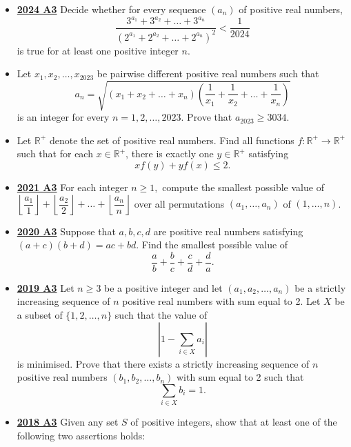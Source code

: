 \documentclass[11pt]{scrartcl}
\begin{document}
\begin{itemize}[leftmargin=*]
Determine all values of $\lambda$ for which Alice has a winning strategy and all those for which Bazza has a winning strategy.
\item \href{https://artofproblemsolving.com/community/c6h3610463p35340954}{\textbf{2024 A3}} Decide whether for every sequence $(a_n)$ of positive real numbers,
$$\frac{3^{a_1}+3^{a_2}+\dots+3^{a_n}}{(2^{a_1}+2^{a_2}+\dots+2^{a_n})^2} < \frac{1}{2024}$$
is true for at least one positive integer $n$.
\item {} Let $x_1,x_2,\dots,x_{2023}$ be pairwise different positive real numbers such that
\[a_n=\sqrt{(x_1+x_2+\dots+x_n)\left(\frac{1}{x_1}+\frac{1}{x_2}+\dots+\frac{1}{x_n}\right)}\]is an integer for every $n=1,2,\dots,2023.$ Prove that $a_{2023} \geqslant  3034$.
\item {} Let $\mathbb{R}^+$ denote the set of positive real numbers. Find all functions $f: \mathbb{R}^+ \to \mathbb{R}^+$ such that for each $x \in \mathbb{R}^+$, there is exactly one $y \in \mathbb{R}^+$ satisfying$$xf(y)+yf(x) \leqslant 2.$$ 
\item \href{https://artofproblemsolving.com/community/c6h2882539p25627503}{\textbf{2021 A3}} For each integer $n\geqslant 1,$ compute the smallest possible value of  $\left\lfloor\dfrac{a_1}{1}\right\rfloor+\left\lfloor\dfrac{a_2}{2}\right\rfloor+\dots+\left\lfloor\dfrac{a_n}{n}\right\rfloor$ over all permutations $(a_1,\dots,a_n)$ of $(1,\dots,n)$.
\item \href{https://artofproblemsolving.com/community/c6h2625839p22697887}{\textbf{2020 A3}} Suppose that $a,b,c,d$ are positive real numbers satisfying $(a+c)(b+d)=ac+bd$. Find the smallest possible value of
$$\frac{a}{b}+\frac{b}{c}+\frac{c}{d}+\frac{d}{a}.$$
\newpage
\item \href{https://artofproblemsolving.com/community/c6h2279061p17829510}{\textbf{2019 A3}} Let $n \geqslant  3$ be a positive integer and let $\left(a_{1}, a_{2}, \dots, a_{n}\right)$ be a strictly increasing sequence of $n$ positive real numbers with sum equal to 2. Let $X$ be a subset of $\{1,2, \dots, n\}$ such that the value of
\[
\left|1-\sum_{i \in X} a_{i}\right|
\]is minimised. Prove that there exists a strictly increasing sequence of $n$ positive real numbers $\left(b_{1}, b_{2}, \dots, b_{n}\right)$ with sum equal to 2 such that
\[
\sum_{i \in X} b_{i}=1.
\]
\item \href{https://artofproblemsolving.com/community/c6h1876779p12752861}{\textbf{2018 A3}} 	Given any set $S$ of positive integers, show that at least one of the following two assertions holds:

\end{itemize}
\end{document}
